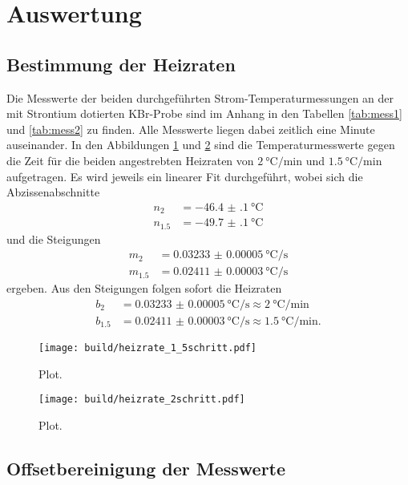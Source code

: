 \section{Auswertung}
\label{sec:Auswertung}

\subsection{Bestimmung der Heizraten}

Die Messwerte der beiden durchgeführten Strom-Temperaturmessungen an der mit
Strontium dotierten KBr-Probe sind im Anhang in den Tabellen \ref{tab:mess1}
und \ref{tab:mess2} zu finden. Alle Messwerte liegen dabei zeitlich eine Minute
auseinander. In den Abbildungen \ref{fig:heizrate2} und \ref{fig:heizrate15} sind
die Temperaturmesswerte gegen die Zeit für die beiden angestrebten Heizraten
von $\SI{2}{\celsius\per\minute}$ und $\SI{1.5}{\celsius\per\minute}$ aufgetragen.
Es wird jeweils ein linearer Fit durchgeführt, wobei sich die Abzissenabschnitte
\begin{align}
  n_{2} &= \SI{-46.4(1)}{\celsius}\\
  n_{1.5} &= \SI{-49.7(1)}{\celsius}
\end{align}
und die Steigungen
\begin{align}
  m_{2} &= \SI{0.03233(5)}{\celsius\per\second}\\
  m_{1.5} &= \SI{0.02411(3)}{\celsius\per\second}
\end{align}
ergeben. Aus den Steigungen folgen sofort die Heizraten
\begin{align}
  b_{2} &= \SI{0.03233(5)}{\celsius\per\second} \approx \SI{2}{\celsius\per\minute} \\
  b_{1.5} &= \SI{0.02411(3)}{\celsius\per\second} \approx \SI{1.5}{\celsius\per\minute}.
\end{align}

\begin{figure}
  \centering
  \texttt{[image: build/heizrate\_1\_5schritt.pdf]}
  \caption{Plot.}
  \label{fig:heizrate2}
\end{figure}

\begin{figure}
  \centering
  \texttt{[image: build/heizrate\_2schritt.pdf]}
  \caption{Plot.}
  \label{fig:heizrate15}
\end{figure}

\subsection{Offsetbereinigung der Messwerte}


